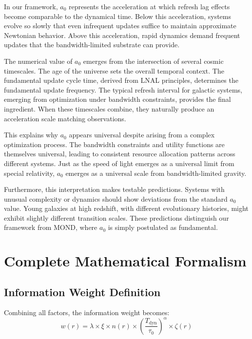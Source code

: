 \documentclass[usenatbib]{mnras}
\begin{document}
In our framework, $a_0$ represents the acceleration at which refresh lag effects become comparable to the dynamical time. Below this acceleration, systems evolve so slowly that even infrequent updates suffice to maintain approximate Newtonian behavior. Above this acceleration, rapid dynamics demand frequent updates that the bandwidth-limited substrate can provide.

The numerical value of $a_0$ emerges from the intersection of several cosmic timescales. The age of the universe sets the overall temporal context. The fundamental update cycle time, derived from LNAL principles, determines the fundamental update frequency. The typical refresh interval for galactic systems, emerging from optimization under bandwidth constraints, provides the final ingredient. When these timescales combine, they naturally produce an acceleration scale matching observations.

This explains why $a_0$ appears universal despite arising from a complex optimization process. The bandwidth constraints and utility functions are themselves universal, leading to consistent resource allocation patterns across different systems. Just as the speed of light emerges as a universal limit from special relativity, $a_0$ emerges as a universal scale from bandwidth-limited gravity.

Furthermore, this interpretation makes testable predictions. Systems with unusual complexity or dynamics should show deviations from the standard $a_0$ value. Young galaxies at high redshift, with different evolutionary histories, might exhibit slightly different transition scales. These predictions distinguish our framework from MOND, where $a_0$ is simply postulated as fundamental.

\section{Complete Mathematical Formalism}
\label{sec:formalism}

\subsection{Information Weight Definition}

Combining all factors, the information weight becomes:
\begin{equation}
w(r) = \lambda \times \xi \times n(r) \times \left(\frac{T_{\text{dyn}}}{\tau_0}\right)^\alpha \times \zeta(r)
\end{equation}
\end{document}
